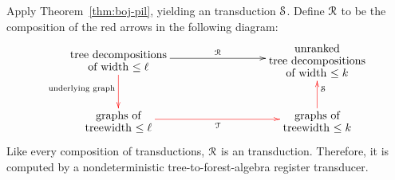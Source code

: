Apply Theorem~\ref{thm:boj-pil}, yielding an \mso transduction ${\mathcal S}$.
Define ${\mathcal R}$ to  be the composition of the  red arrows in the following diagram:
\begin{align*}
    \xymatrix@C=3cm{
        \txt{tree decompositions\\ of width $\le \ell$}
        \ar@[red][d]_{\txt{\scriptsize underlying graph}}
         \ar[r]^\Rr & 
         \txt{unranked \\ 
         tree decompositions\\
         of width $\le k$}
         \\
        \txt{graphs of\\ treewidth $\le \ell$}\ar@[red][r]_\Tt &
        \txt{graphs  of\\ treewidth $\le k$} 
        \ar@[red][u]_{\Ss}
    }
    \end{align*}
Like every composition of \mso transductions, ${\mathcal R}$ is an \mso transduction. Therefore, it is computed by a nondeterministic tree-to-forest-algebra register transducer.